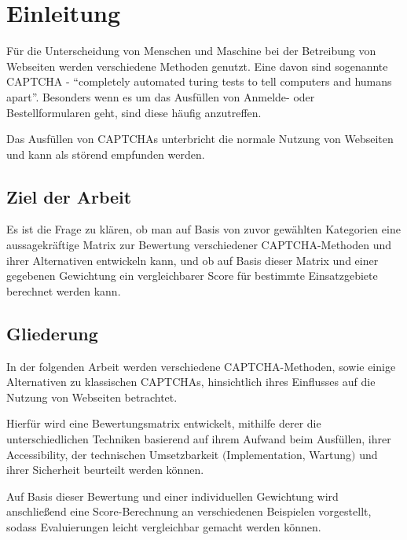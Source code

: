 \chapter{Einleitung}
\label{ch:intro}

Für die Unterscheidung von Menschen und Maschine bei der Betreibung von Webseiten werden verschiedene Methoden genutzt.
Eine davon sind sogenannte CAPTCHA - ``completely automated turing tests to tell computers and humans apart''.
Besonders wenn es um das Ausfüllen von Anmelde- oder Bestellformularen geht, sind diese häufig anzutreffen.


Das Ausfüllen von CAPTCHAs unterbricht die normale Nutzung von Webseiten und kann als störend empfunden werden.




%
%
\section{Ziel der Arbeit}
\label{sec:intro:goal}
Es ist die Frage zu klären, ob man auf Basis von zuvor gewählten Kategorien eine aussagekräftige Matrix zur
Bewertung verschiedener CAPTCHA-Methoden und ihrer Alternativen entwickeln kann, und ob auf Basis dieser Matrix und einer gegebenen Gewichtung
ein vergleichbarer Score für bestimmte Einsatzgebiete berechnet werden kann.

%
%
\section{Gliederung}
\label{sec:intro:structure}
In der folgenden Arbeit werden verschiedene CAPTCHA-Methoden, sowie einige Alternativen zu klassischen CAPTCHAs,
hinsichtlich ihres Einflusses auf die Nutzung von Webseiten betrachtet.

Hierfür wird eine Bewertungsmatrix entwickelt, mithilfe derer die unterschiedlichen Techniken basierend auf
ihrem Aufwand beim Ausfüllen, ihrer Accessibility, der technischen Umsetzbarkeit $($Implementation, Wartung$)$ und ihrer Sicherheit beurteilt werden können.

Auf Basis dieser Bewertung und einer individuellen Gewichtung wird anschließend eine Score-Berechnung an verschiedenen Beispielen vorgestellt,
sodass Evaluierungen leicht vergleichbar gemacht werden können.